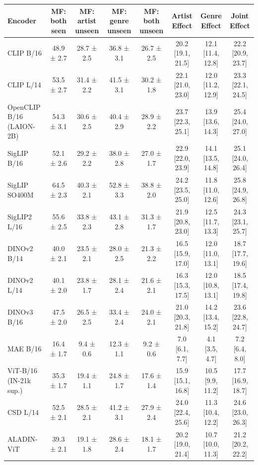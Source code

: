 \begin{tabular}{lccccccc}
\toprule
Encoder & MF: both seen & MF: artist unseen & MF: genre unseen & MF: both unseen & Artist Effect & Genre Effect & Joint Effect \\
\midrule
CLIP B/16 & 48.9 ± 2.7 & 28.7 ± 2.5 & 36.8 ± 3.1 & 26.7 ± 2.5 & 20.2 [19.1, 21.5] & 12.1 [11.4, 12.8] & 22.2 [20.9, 23.7] \\
CLIP L/14 & 53.5 ± 2.7 & 31.4 ± 2.2 & 41.5 ± 3.1 & 30.2 ± 1.8 & 22.1 [21.0, 23.0] & 12.0 [11.2, 12.9] & 23.3 [22.1, 24.5] \\
OpenCLIP B/16 (LAION-2B) & 54.3 ± 3.1 & 30.6 ± 2.5 & 40.4 ± 2.9 & 28.9 ± 2.2 & 23.7 [22.3, 25.1] & 13.9 [13.6, 14.3] & 25.4 [24.0, 27.0] \\
SigLIP B/16 & 52.1 ± 2.6 & 29.2 ± 2.2 & 38.0 ± 2.8 & 27.0 ± 1.7 & 22.9 [22.0, 23.9] & 14.1 [13.5, 14.8] & 25.1 [24.0, 26.4] \\
SigLIP SO400M & 64.5 ± 2.3 & 40.3 ± 2.1 & 52.8 ± 3.3 & 38.8 ± 2.0 & 24.2 [23.5, 25.0] & 11.8 [11.0, 12.6] & 25.8 [24.9, 26.8] \\
SigLIP2 L/16 & 55.6 ± 2.5 & 33.8 ± 2.3 & 43.1 ± 2.8 & 31.3 ± 1.7 & 21.9 [20.8, 23.0] & 12.5 [11.7, 13.3] & 24.3 [23.1, 25.7] \\
DINOv2 B/14 & 40.0 ± 2.1 & 23.5 ± 2.1 & 28.0 ± 2.5 & 21.3 ± 2.2 & 16.5 [15.9, 17.0] & 12.0 [11.0, 13.1] & 18.7 [17.7, 19.6] \\
DINOv2 L/14 & 40.1 ± 2.0 & 23.8 ± 1.7 & 28.1 ± 2.4 & 21.6 ± 2.1 & 16.3 [15.3, 17.5] & 12.0 [10.8, 13.1] & 18.5 [17.4, 19.8] \\
DINOv3 B/16 & 47.5 ± 2.0 & 26.5 ± 2.5 & 33.4 ± 2.4 & 24.0 ± 2.1 & 21.0 [20.3, 21.8] & 14.2 [13.4, 15.2] & 23.6 [22.8, 24.7] \\
MAE B/16 & 16.4 ± 1.7 & 9.4 ± 0.6 & 12.3 ± 1.1 & 9.2 ± 0.6 & 7.0 [6.1, 7.7] & 4.1 [3.5, 4.7] & 7.2 [6.4, 8.0] \\
ViT-B/16 (IN-21k sup.) & 35.3 ± 1.7 & 19.4 ± 1.1 & 24.8 ± 1.7 & 17.6 ± 1.4 & 15.9 [15.1, 16.8] & 10.5 [9.9, 11.2] & 17.7 [16.9, 18.7] \\
CSD L/14 & 52.5 ± 2.1 & 28.5 ± 2.1 & 41.2 ± 3.1 & 27.9 ± 2.4 & 24.0 [22.4, 25.6] & 11.3 [10.4, 12.2] & 24.6 [23.0, 26.3] \\
ALADIN-ViT & 39.3 ± 2.1 & 19.1 ± 1.8 & 28.6 ± 2.4 & 18.1 ± 1.7 & 20.2 [19.0, 21.4] & 10.7 [10.0, 11.3] & 21.2 [20.2, 22.2] \\
\bottomrule
\end{tabular}
